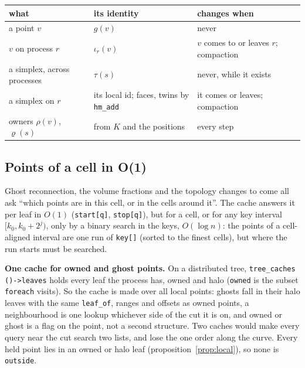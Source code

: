 \documentclass[10pt,a4paper]{article}
\theoremstyle{definition}
\newcommand{\fn}[1]{\texttt{#1}}
\begin{document}
\begin{center}
\small
\begin{tabularx}{\textwidth}{@{}>{\raggedright}p{}
    >{\raggedright}p{}X@{}}
  \toprule
  what & its identity & changes when \\
  \midrule
  a point $v$ & $g(v)$ & never \\
  $v$ on process $r$ & $\iota_r(v)$ & $v$ comes to or leaves $r$;
    compaction \\
  a simplex, across processes & $\tau(s)$ & never, while it exists \\
  a simplex on $r$ & its local id; faces, twins by \fn{hm\_add} &
    it comes or leaves; compaction \\
  owners $\rho(v)$, $\varrho(s)$ & from $K$ and the positions & every
    step \\
  \bottomrule
\end{tabularx}
\end{center}

\subsection{Points of a cell in O(1)}
\label{sec:part-cell}

Ghost reconnection, the volume fractions and the topology changes to come
all ask ``which points are in this cell, or in the cells around it''. The
cache answers it per leaf in $O(1)$ (\fn{start[q]}, \fn{stop[q]}), but for a
cell, or for any key interval $[k_0, k_0 + 2^j)$, only by a binary search
in the keys, $O(\log n)$: the points of a cell-aligned interval are one run
of \fn{key[]} (sorted to the finest cells), but where the run starts must be
searched.

\textbf{One cache for owned and ghost points.} On a distributed tree,
\fn{tree\_caches ()->leaves} holds every leaf the process has, owned and
halo (\fn{owned} is the subset \fn{foreach} visits). So the cache is made
over all local points: ghosts fall in their halo leaves with the same
\fn{leaf\_of}, ranges and offsets as owned points, a neighbourhood is one
lookup whichever side of the cut it is on, and owned or ghost is a flag on
the point, not a second structure. Two caches would make every query near
the cut search two lists, and lose the one order along the curve. Every
held point lies in an owned or halo leaf
(proposition~\ref{prop:local}), so none is \fn{outside}.
\end{document}
